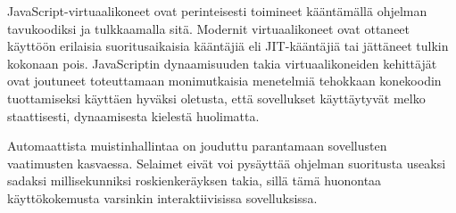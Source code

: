 JavaScript-virtuaalikoneet ovat perinteisesti toimineet kääntämällä ohjelman tavukoodiksi ja tulkkaamalla sitä. Modernit virtuaalikoneet ovat ottaneet käyttöön erilaisia suoritusaikaisia kääntäjiä eli JIT-kääntäjiä tai jättäneet tulkin kokonaan pois. JavaScriptin dynaamisuuden takia virtuaalikoneiden kehittäjät ovat joutuneet toteuttamaan monimutkaisia menetelmiä tehokkaan konekoodin tuottamiseksi käyttäen hyväksi oletusta, että sovellukset käyttäytyvät melko staattisesti, dynaamisesta kielestä huolimatta.

Automaattista muistinhallintaa on jouduttu parantamaan sovellusten vaatimusten kasvaessa. Selaimet eivät voi pysäyttää ohjelman suoritusta useaksi sadaksi millisekunniksi roskienkeräyksen takia, sillä tämä huonontaa käyttökokemusta varsinkin interaktiivisissa sovelluksissa.